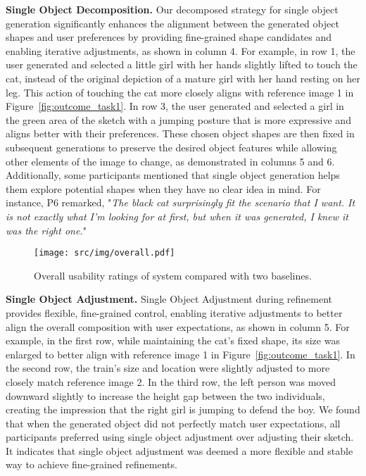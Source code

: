 \textbf{Single Object Decomposition.} Our decomposed strategy for single object generation significantly enhances the alignment between the generated object shapes and user preferences by providing fine-grained shape candidates and enabling iterative adjustments, as shown in column 4.
For example, in row 1, the user generated and selected a little girl with her hands slightly lifted to touch the cat, instead of the original depiction of a mature girl with her hand resting on her leg. 
This action of touching the cat more closely aligns with reference image 1 in Figure~\ref{fig:outcome_task1}. 
In row 3, the user generated and selected a girl in the green area of the sketch with a jumping posture that is more expressive and aligns better with their preferences. 
These chosen object shapes are then fixed in subsequent generations to preserve the desired object features while allowing other elements of the image to change, as demonstrated in columns 5 and 6.
Additionally, some participants mentioned that single object generation helps them explore potential shapes when they have no clear idea in mind. 
For instance, P6 remarked, "\emph{The black cat surprisingly fit the scenario that I want. It is not exactly what I'm looking for at first, but when it was generated, I knew it was the right one.}"

\begin{figure*}[t]
    \centering
    \texttt{[image: src/img/overall.pdf]}
    \vspace{-2mm}
    \caption{Overall usability ratings of system compared with two baselines.}
    \label{fig:overall}
    \vspace{-3mm}
\end{figure*}

\textbf{Single Object Adjustment.} Single Object Adjustment during refinement provides flexible, fine-grained control, enabling iterative adjustments to better align the overall composition with user expectations, as shown in column 5. 
For example, in the first row, while maintaining the cat's fixed shape, its size was enlarged to better align with reference image 1 in Figure~\ref{fig:outcome_task1}.
In the second row, the train's size and location were slightly adjusted to more closely match reference image 2.
In the third row, the left person was moved downward slightly to increase the height gap between the two individuals, creating the impression that the right girl is jumping to defend the boy. 
We found that when the generated object did not perfectly match user expectations, all participants preferred using single object adjustment over adjusting their sketch. 
It indicates that single object adjustment was deemed a more flexible and stable way to achieve fine-grained refinements.

